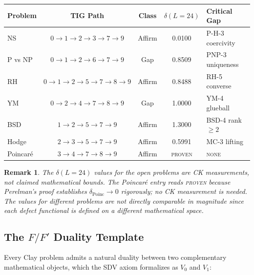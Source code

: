 \documentclass[11pt]{article}
\newtheorem{remark}[theorem]{Remark}
\begin{document}
\begin{center}
\begin{tabular}{@{}lcccl@{}}
\toprule
Problem & TIG Path & Class & $\delta(L{=}24)$ & Critical Gap \\
\midrule
NS & $0{\to}1{\to}2{\to}3{\to}7{\to}9$ & Affirm & 0.0100 & P-H-3 coercivity \\
P vs NP & $0{\to}1{\to}2{\to}6{\to}7{\to}9$ & Gap & 0.8509 & PNP-3 uniqueness \\
RH & $0{\to}1{\to}2{\to}5{\to}7{\to}8{\to}9$ & Affirm & 0.8488 & RH-5 converse \\
YM & $0{\to}2{\to}4{\to}7{\to}8{\to}9$ & Gap & 1.0000 & YM-4 glueball \\
BSD & $1{\to}2{\to}5{\to}7{\to}9$ & Affirm & 1.3000 & BSD-4 rank $\geq 2$ \\
Hodge & $2{\to}3{\to}5{\to}7{\to}9$ & Affirm & 0.5991 & MC-3 lifting \\
Poincar\'e & $3{\to}4{\to}7{\to}8{\to}9$ & Affirm & \textsc{proven} & \textsc{none} \\
\bottomrule
\end{tabular}
\end{center}

\begin{remark}
The $\delta(L{=}24)$ values for the open problems are CK measurements,
not claimed mathematical bounds.  The Poincar\'e entry reads
\textsc{proven} because Perelman's proof establishes
$\delta_{\mathrm{Poinc}} \to 0$ rigorously; no CK measurement is
needed.  The values for different problems are not directly comparable
in magnitude since each defect functional is defined on a different
mathematical space.
\end{remark}

\subsection{The $F/F'$ Duality Template}
\label{subsec:duality}

Every Clay problem admits a natural duality between two complementary
mathematical objects, which the SDV axiom formalizes as $V_0$ and $V_1$:
\end{document}

